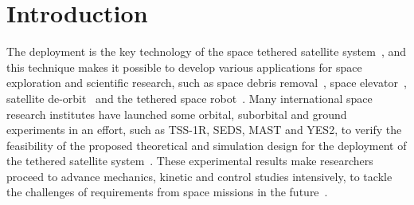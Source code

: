\documentclass[Journal,letterpaper]{ascelike-new}
\theoremstyle{plain}
\theoremstyle{remark}
\begin{document}
\section{Introduction}
The deployment is the key technology of the space tethered satellite system~\cite{wen2008advances,yousefian2015anti}, and this technique makes it possible to develop various applications for space exploration and scientific research, such as space debris removal~\cite{zhao2014thrust}, space elevator~\cite{kojima2015mission}, satellite de-orbit~\cite{zhong2013dynamics,zhong2013long} and the tethered space robot~\cite{huang2014optimal}. Many international space research institutes have launched some orbital, suborbital and ground experiments in an effort, such as TSS-1R, SEDS, MAST and YES2, to verify the feasibility of the proposed theoretical and simulation design for the deployment of the tethered satellite system~\cite{williams2012review,robitaille2006interpreting,stone1998tss,williams2009yes2}. These experimental results make researchers proceed to advance mechanics, kinetic and control studies intensively, to tackle the challenges of requirements from space missions in the future~\cite{yu2016nonlinear,wen2015space,aslanov2016swing,meng2016lyapunov,zhang2015line}.\par
\end{document}
